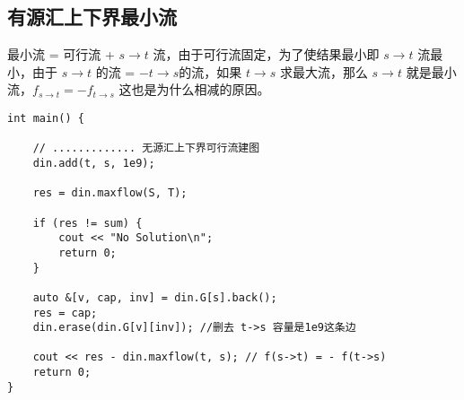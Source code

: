 \subsection{有源汇上下界最小流}
\par \noindent 最小流 = 可行流 + $s\to t$ 流，由于可行流固定，为了使结果最小即 $s\to t$ 流最小，由于 $s\to t$ 的流 = $- t\to s$的流，如果 $t\to s$ 求最大流，那么 $s\to t$ 就是最小流，$f_{s\to t}=-f_{t\to s}$ 这也是为什么相减的原因。
\begin{verbatim}
int main() {
    
    // ............. 无源汇上下界可行流建图
    din.add(t, s, 1e9);

    res = din.maxflow(S, T);

    if (res != sum) {
        cout << "No Solution\n";
        return 0;
    }

    auto &[v, cap, inv] = din.G[s].back();
    res = cap;
    din.erase(din.G[v][inv]); //删去 t->s 容量是1e9这条边

    cout << res - din.maxflow(t, s); // f(s->t) = - f(t->s)
    return 0;
}
\end{verbatim}

